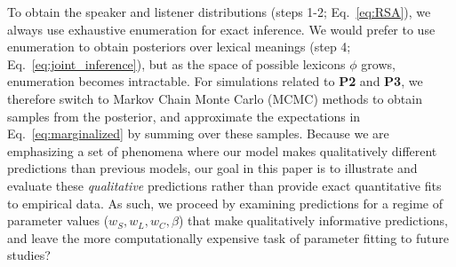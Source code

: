 To obtain the speaker and listener distributions (steps 1-2; Eq.~\ref{eq:RSA}), we always use exhaustive enumeration for exact inference.
We would prefer to use enumeration to obtain posteriors over lexical meanings (step 4; Eq.~\ref{eq:joint_inference}), but as the space of possible lexicons $\phi$ grows, enumeration becomes intractable.
For simulations related to \textbf{P2} and \textbf{P3}, we therefore switch to Markov Chain Monte Carlo (MCMC) methods to obtain samples from the posterior, and approximate the expectations in Eq.~\ref{eq:marginalized} by summing over these samples. 
Because we are emphasizing a set of phenomena where our model makes qualitatively different predictions than previous models, our goal in this paper is to illustrate and evaluate these \emph{qualitative} predictions rather than provide exact quantitative fits to empirical data.
As such, we proceed by examining predictions for a regime of parameter values ($w_S, w_L, w_C,\beta$) that make qualitatively informative predictions, and leave the more computationally expensive task of parameter fitting to future studies?
